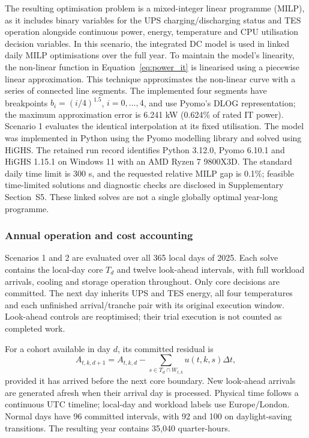 \documentclass[lettersize,journal]{IEEEtran}
\begin{document}
The resulting optimisation problem is a mixed-integer linear programme (MILP), as it includes binary variables for the UPS charging/discharging status and TES operation alongside continuous power, energy, temperature and CPU utilisation decision variables. In this scenario, the integrated DC model is used in linked daily MILP optimisations over the full year. To maintain the model's linearity, the non-linear function in Equation~\eqref{eq:power_it} is linearised using a piecewise linear approximation. This technique approximates the non-linear curve with a series of connected line segments. The implemented four segments have breakpoints $b_i=(i/4)^{1.5}$, $i=0,\ldots,4$, and use Pyomo's DLOG representation; the maximum approximation error is 6.241 kW (0.624\% of rated IT power). Scenario 1 evaluates the identical interpolation at its fixed utilisation. The model was implemented in Python using the Pyomo modelling library and solved using HiGHS. The retained run record identifies Python 3.12.0, Pyomo 6.10.1 and HiGHS 1.15.1 on Windows 11 with an AMD Ryzen 7 9800X3D. The standard daily time limit is 300 s, and the requested relative MILP gap is 0.1\%; feasible time-limited solutions and diagnostic checks are disclosed in Supplementary Section~S5. These linked solves are not a single globally optimal year-long programme.



\subsubsection{Annual operation and cost accounting}\label{sec:annual-operation}
Scenarios 1 and 2 are evaluated over all 365 local days of 2025. Each solve contains the local-day core $T_d$ and twelve look-ahead intervals, with full workload arrivals, cooling and storage operation throughout. Only core decisions are committed. The next day inherits UPS and TES energy, all four temperatures and each unfinished arrival/tranche pair with its original execution window. Look-ahead controls are reoptimised; their trial execution is not counted as completed work.

For a cohort available in day $d$, its committed residual is
\begin{equation}
A_{t,k,d+1}=A_{t,k,d}-\sum_{s\in T_d\cap W_{t,k}}u(t,k,s)\Delta t,
\label{eq:cohort-handoff}
\end{equation}
provided it has arrived before the next core boundary. New look-ahead arrivals are generated afresh when their arrival day is processed. Physical time follows a continuous UTC timeline; local-day and workload labels use Europe/London. Normal days have 96 committed intervals, with 92 and 100 on daylight-saving transitions. The resulting year contains 35,040 quarter-hours.
\end{document}
